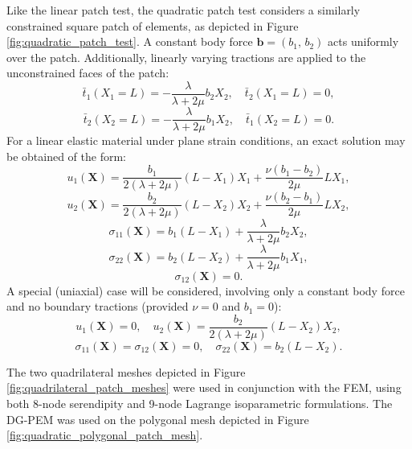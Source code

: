 Like the linear patch test, the quadratic patch test considers a similarly constrained square patch of elements, as depicted in Figure \ref{fig:quadratic_patch_test}. A constant body force $\mathbf{b} = (b_1, \, b_2)$ acts uniformly over the patch. Additionally, linearly varying tractions are applied to the unconstrained faces of the patch:
\begin{equation}
	\bar{t}_1 (X_1 = L) = - \frac{\lambda}{\lambda + 2 \mu} b_2 X_2, \quad \bar{t}_2 (X_1 = L) = 0,
\end{equation}
\begin{equation}
	\bar{t}_2 (X_2 = L) = - \frac{\lambda}{\lambda + 2 \mu} b_1 X_2, \quad \bar{t}_1 (X_2 = L) = 0.
\end{equation}
For a linear elastic material under plane strain conditions, an exact solution may be obtained of the form:
\begin{equation}
	u_1 (\mathbf{X}) = \frac{b_1}{2 (\lambda + 2 \mu)} (L - X_1) X_1 + \frac{\nu (b_1 - b_2)}{2 \mu} L X_1,
\end{equation}
\begin{equation}
	u_2 (\mathbf{X}) = \frac{b_2}{2 (\lambda + 2 \mu)} (L - X_2) X_2 + \frac{\nu (b_2 - b_1)}{2 \mu} L X_2,
\end{equation}
\begin{equation}
	\sigma_{11} (\mathbf{X}) = b_1 (L - X_1) + \frac{\lambda}{\lambda + 2 \mu} b_2 X_2,
\end{equation}
\begin{equation}
	\sigma_{22} (\mathbf{X}) = b_2 (L -  X_2) + \frac{\lambda}{\lambda + 2 \mu} b_1 X_1,
\end{equation}
\begin{equation}
	\sigma_{12} (\mathbf{X}) = 0.
\end{equation}
A special (uniaxial) case will be considered, involving only a constant body force and no boundary tractions (provided $\nu = 0$ and $b_1 = 0$):
\begin{equation}
	u_1 (\mathbf{X}) = 0, \quad u_2 (\mathbf{X}) = \frac{b_2}{2 (\lambda + 2 \mu)} (L - X_2) X_2,
\end{equation}
\begin{equation}
	\sigma_{11} (\mathbf{X}) = \sigma_{12} (\mathbf{X}) = 0, \quad \sigma_{22} (\mathbf{X}) = b_2 (L -  X_2).
\end{equation}

The two quadrilateral meshes depicted in Figure \ref{fig:quadrilateral_patch_meshes} were used in conjunction with the FEM, using both 8-node serendipity and 9-node Lagrange isoparametric formulations. The DG-PEM was used on the polygonal mesh depicted in Figure \ref{fig:quadratic_polygonal_patch_mesh}.

